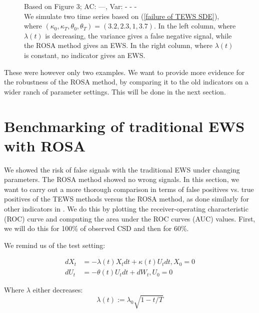 \documentclass[%
thesis=student,%
coverpage=false,%
titlepage=false,%
headmarks=true, %
english,%
font=libertine, %
math=newpxtx, %
BCOR=5mm,%
coverBCOR=11mm%
]{tumbook}
\begin{document}
\begin{figure}
\begin{minipage}{0.49\textwidth}
    \end{minipage}
    \begin{minipage}{\textwidth}
    \centering
    \caption{Based on \cite{Morr:2024} Figure 3; AC: ---, Var: - - - \\
    We simulate two time series based on (\ref{failure of TEWS SDE}), where $(\kappa_{0},\kappa_{T},\theta_{0},\theta_{T}) = (3.2,2.3,1,3.7)$. In the left column, where $\lambda(t)$ is decreasing, the variance gives a false negative signal, while the ROSA method gives an EWS. In the right column, where $\lambda(t)$ is constant, no indicator gives an EWS. 
    }
    \label{false negative example}
    \end{minipage}    
\end{figure}


These were however only two examples. We want to provide more evidence for the robustness of the ROSA method, by comparing it to the old indicators on a wider ranch of parameter settings. This will be done in the next section.
    


\chapter{Benchmarking of traditional EWS with ROSA}

We showed the risk of false signals with the traditional EWS under changing parameters.
The ROSA method showed no wrong signals.
In this section, we want to carry out a more thorough comparison in terms of false positives vs. true positives of the TEWS methods versus the ROSA method, as done similarly for other indicators in \cite{Morr:2024}. We do this by plotting the receiver-operating characteristic (ROC) curve and computing the area under the ROC curves (AUC) values. First, we will do this for 100\% of observed CSD and then for 60\%.

We remind us of the test setting: 

\begin{subequations}
    \begin{align*}
        dX_{t} &= -\lambda(t) X_{t}dt + \kappa(t) U_{t}dt, X_{0} = 0 \\
        dU_{t} &= -\theta(t) U_{t}dt + dW_{t}, U_{0} = 0
    \end{align*}
\end{subequations}

Where $\lambda$ either decreases: 
    \[
    \lambda(t) := \lambda_{0}\sqrt{1-t/T}
    \]
\end{document}
